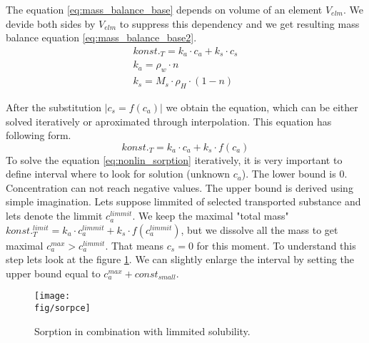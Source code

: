 The equation \ref{eq:mass_balance_base} depends on volume of an element $V_{elm}$. We devide both sides by $V_{elm}$ to suppress this dependency and we get resulting mass balance equation \ref{eq:mass_balance_base2}.
\begin{equation}
 \begin{array}{l}
  konst._T = k_a\cdot c_a + k_s\cdot c_s\\
  k_a = \rho_w\cdot n\\
  k_s = M_s \cdot\rho_H\cdot(1-n)
 \end{array}
 \label{eq:mass_balance_base2}
\end{equation}

After the substitution $|c_s = f(c_a)|$ we obtain the equation, which can be either solved iteratively or aproximated through interpolation. This equation has following form.
\begin{equation}
 konst._T = k_a\cdot c_a + k_s\cdot f(c_a)
 \label{eq:nonlin_sorption}
\end{equation}
To solve the equation \ref{eq:nonlin_sorption} iteratively, it is very important to define interval where to look for solution (unknown $c_a$). The lower bound is $0$. Concentration can not reach negative values. The upper bound is derived using simple imagination. Lets suppose limmited  of selected transported substance and lets denote the limmit $c_a^{limmit}$. We keep the maximal "total mass" $konst._T^{limit}= k_a\cdot c_a^{limmit} + k_s\cdot f(c_a^{limmit})$, but we dissolve all the mass to get maximal $c_a^{max} > c_a^{limmit}$. That means $c_s = 0$ for this moment. To understand this step lets look at the figure \ref{fig:sorpce}. We can slightly enlarge the interval by setting the upper bound equal to $c_a^{max} + const_{small}$.

\begin{figure}[ht!]
 \centering
 \texttt{[image: \\fig/sorpce]}
 \caption{Sorption in combination with limmited solubility.}
 \label{fig:sorpce}
\end{figure}


